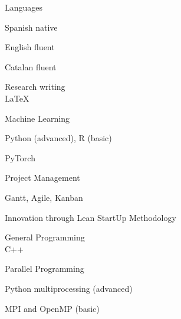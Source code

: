 

\begin{multicols}{3}
    
    \cvskill
        {Languages} %
        {\begin{cvitems} %
        \vspace{-4mm}
        \item Spanish native
        \item English fluent
        \item Catalan fluent
        \end{cvitems}}
        
    \cvskill
        {Research writing} %
        {\\LaTeX}
        
    \cvskill
        {Machine Learning} %
        {\begin{cvitems} %
        \vspace{-4mm}
        \item Python (advanced), R (basic)  
        \item PyTorch
        \end{cvitems}}
        
    \columnbreak
    
    \cvskill
        {Project Management} %
        {\begin{cvitems} %
        \vspace{-5mm}
        \item Gantt, Agile, Kanban
        \item Innovation through Lean StartUp Methodology
        \end{cvitems}}
    
    \cvskill
        {General Programming} %
        {\\C++}

    \cvskill
        {Parallel Programming} %
         {\begin{cvitems} %
        \vspace{-4mm}
        \item Python multiprocessing (advanced)  
        \item MPI and OpenMP (basic)
        \end{cvitems}}

        
    \columnbreak    
    

\end{multicols}
